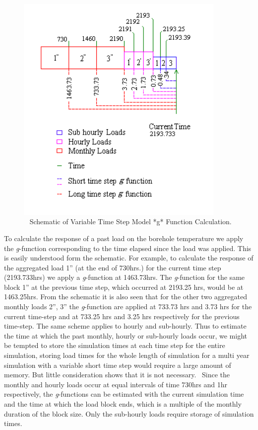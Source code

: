 \begin{figure}[hbtp] %
\centering
\includegraphics[width=0.9\textwidth, height=0.9\textheight, keepaspectratio=true]{media/image5656.png}
\caption{  Schematic of Variable Time Step Model *g* Function Calculation. \protect \label{fig:schematic-of-variable-time-step-model-g}}
\end{figure}

To calculate the response of a past load on the borehole temperature we apply the \emph{g}-function corresponding to the time elapsed since the load was applied. This is easily understood form the schematic. For example, to calculate the response of the aggregated load 1'' (at the end of 730hrs.) for the current time step (2193.733hrs) we apply a \emph{g}-function at 1463.73hrs. The \emph{g}-function for the same block 1'' at the previous time step, which occurred at 2193.25 hrs, would be at 1463.25hrs. From the schematic it is also seen that for the other two aggregated monthly loads 2'', 3'' the \emph{g}-function are applied at 733.73 hrs and 3.73 hrs for the current time-step and at 733.25 hrs and 3.25 hrs respectively for the previous time-step. The same scheme applies to hourly and sub-hourly. Thus to estimate the time at which the past monthly, hourly or sub-hourly loads occur, we might be tempted to store the simulation times at each time step for the entire simulation, storing load times for the whole length of simulation for a multi year simulation with a variable short time step would require a large amount of memory. But little consideration shows that it is not necessary.~ Since the monthly and hourly loads occur at equal intervals of time 730hrs and 1hr respectively, the \emph{g}-functions can be estimated with the current simulation time and the time at which the load block ends, which is a multiple of the monthly duration of the block size. Only the sub-hourly loads require storage of simulation times.

